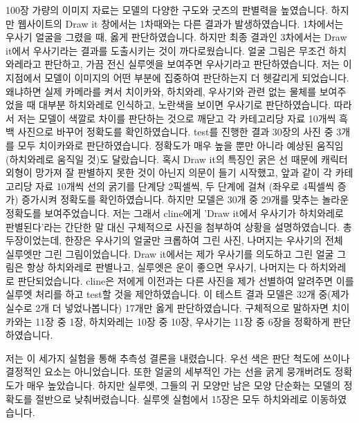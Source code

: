 \documentclass[11pt]{article}
\begin{document}
 100장 가량의 이미지 자료는 모델의 다양한 구도와 굿즈의 판별력을 높였습니다. 
하지만 웹사이트의 Draw it 창에서는 1차때와는 다른 결과가 발생하였습니다. 1차에서는 우사기 얼굴을 그렸을 때, 옳게 판단하였습니다. 
하지만 최종 결과인 3차에서는 Draw it에서 우사기라는 결과를 도출시키는 것이 까다로웠습니다. 
얼굴 그림은 무조건 하치와레라고 판단하고, 가끔 전신 실루엣을 보여주면 우사기라고 판단하였습니다. 
저는 이 지점에서 모델이 이미지의 어떤 부분에 집중하여 판단하는지 더 헷갈리게 되었습니다. 
왜냐하면 실제 카메라를 켜서 치이카와, 하치와레, 우사기와 관련 없는 물체를 보여주었을 때 대부분 하치와레로 인식하고, 노란색을 보이면 우사기로 판단하였습니다.
따라서 저는 모델이 색깔로 차이를 판단하는 것으로 깨닫고 각 카테고리당 자료 10개씩 흑백 사진으로 바꾸어 정확도를 확인하였습니다. 
test를 진행한 결과 30장의 사진 중 3개를 모두 치이카와로 판단하였습니다. 정확도가 매우 높을 뿐만 아니라 예상된 움직임(하치와레로 움직일 것)도 달랐습니다.
혹시 Draw it의 특징인 굵은 선 때문에 캐릭터 외형이 망가져 잘 판별하지 못한 것이 아닌지 의문이 들기 시작했고, 
앞과 같이 각 카테고리당 자료 10개씩 선의 굵기를 단계당 2픽셀씩, 두 단계에 걸쳐 (좌우로 4픽셀씩 증가) 증가시켜 정확도를 확인하였습니다. 
하지만 모델은 30개 중 29개를 맞추는 놀라운 정확도를 보여주었습니다.
저는 그래서 cline에게 'Draw it에서 우사기가 하치와레로 판별된다'라는 간단한 말 대신 구체적으로 사진을 첨부하여 상황을 설명하였습니다. 
총 두장이었는데, 한장은 우사기의 얼굴만 크롭하여 그린 사진, 나머지는 우사기의 전체 실루엣만 그린 그림이었습니다. 
Draw it에서는 제가 우사기를 의도하고 그린 얼굴 그림은 항상 하치와레로 판별나고, 실루엣은 운이 좋으면 우사기, 나머지는 다 하치와레로 판단되었습니다. 
cline은 저에게 이전과는 다른 사진을 제가 선별하여 알려주면 이를 실루엣 처리를 하고 test할 것을 제안하였습니다. 이 테스트 결과 모델은 32개 중(제가 실수로 2개 더 넣었나봅니다) 17개만 옳게 판단하였습니다. 
구체적으로 말하자면 치이카와는 11장 중 1장, 하치와레는 10장 중 10장, 우사기는 11장 중 6장을 정확하게 판단하였습니다. 

 저는 이 세가지 실험을 통해 추측성 결론을 내렸습니다. 우선 색은 판단 척도에 쓰이나 결정적인 요소는 아니었습니다. 
또한 얼굴의 세부적인 가는 선을 굵게 뭉개버려도 정확도가 매우 높았습니다. 
하지만 실루엣, 그들의 귀 모양만 남은 모양 단순화는 모델의 정확도를 절반으로 낮춰버렸습니다. 
실루엣 실험에서 15장은 모두 하치와레로 이동하였습니다. 
\end{document}
